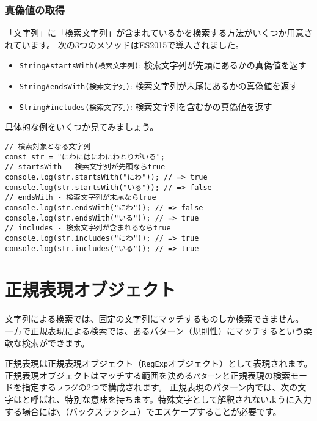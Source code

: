 \hypertarget{test-by-string}{%
\subsubsection{真偽値の取得}\label{test-by-string}}

「文字列」に「検索文字列」が含まれているかを検索する方法がいくつか用意されています。
次の3つのメソッドはES2015で導入されました。

\begin{itemize}
\item
  \texttt{String\#startsWith(検索文字列)}\protect{}:
  検索文字列が先頭にあるかの真偽値を返す
\item
  \texttt{String\#endsWith(検索文字列)}\protect{}:
  検索文字列が末尾にあるかの真偽値を返す
\item
  \texttt{String\#includes(検索文字列)}\protect{}:
  検索文字列を含むかの真偽値を返す
\end{itemize}

具体的な例をいくつか見てみましょう。

\begin{lstlisting}
// 検索対象となる文字列
const str = "にわにはにわにわとりがいる";
// startsWith - 検索文字列が先頭ならtrue
console.log(str.startsWith("にわ")); // => true
console.log(str.startsWith("いる")); // => false
// endsWith - 検索文字列が末尾ならtrue
console.log(str.endsWith("にわ")); // => false
console.log(str.endsWith("いる")); // => true
// includes - 検索文字列が含まれるならtrue
console.log(str.includes("にわ")); // => true
console.log(str.includes("いる")); // => true
\end{lstlisting}

\hypertarget{regexp-object}{%
\section{正規表現オブジェクト}\label{regexp-object}}

文字列による検索では、固定の文字列にマッチするものしか検索できません。
一方で正規表現による検索では、あるパターン（規則性）にマッチするという柔軟な検索ができます。

正規表現は正規表現オブジェクト（\texttt{RegExp}オブジェクト）として表現されます。
正規表現オブジェクトはマッチする範囲を決める\texttt{パターン}と正規表現の検索モードを指定する\texttt{フラグ}の2つで構成されます。
正規表現のパターン内では、次の文字は\textbf{}と呼ばれ、特別な意味を持ちます。特殊文字として解釈されないように入力する場合には\texttt{\textbackslash}（バックスラッシュ）でエスケープすることが必要です。

